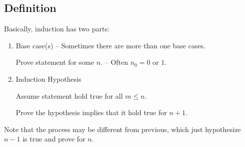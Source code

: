 \subsection{Definition}
Basically, induction has two parts:
\begin{enumerate}
\item {Base case(s) -- Sometimes there are more than one base cases.

Prove statement for some $n$. -- Often $n_0 = 0 \text{ or } 1$.}

\item {Induction Hypothesis

Assume statement hold true for all $m \leq n$.

Prove the hypothesis implies that it hold true for $n+1$.}
\end{enumerate}

Note that the process may be different from previous, which just hypothesize $n-1$ is true and prove for $n$.






